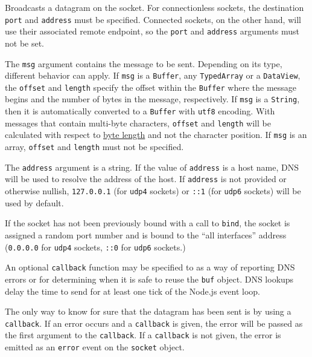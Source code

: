 Broadcasts a datagram on the socket. For connectionless sockets, the
destination \texttt{port} and \texttt{address} must be specified.
Connected sockets, on the other hand, will use their associated remote
endpoint, so the \texttt{port} and \texttt{address} arguments must not
be set.

The \texttt{msg} argument contains the message to be sent. Depending on
its type, different behavior can apply. If \texttt{msg} is a
\texttt{Buffer}, any \texttt{TypedArray} or a \texttt{DataView}, the
\texttt{offset} and \texttt{length} specify the offset within the
\texttt{Buffer} where the message begins and the number of bytes in the
message, respectively. If \texttt{msg} is a \texttt{String}, then it is
automatically converted to a \texttt{Buffer} with
\texttt{\textquotesingle{}utf8\textquotesingle{}} encoding. With
messages that contain multi-byte characters, \texttt{offset} and
\texttt{length} will be calculated with respect to
\href{buffer.md\#static-method-bufferbytelengthstring-encoding}{byte
length} and not the character position. If \texttt{msg} is an array,
\texttt{offset} and \texttt{length} must not be specified.

The \texttt{address} argument is a string. If the value of
\texttt{address} is a host name, DNS will be used to resolve the address
of the host. If \texttt{address} is not provided or otherwise nullish,
\texttt{\textquotesingle{}127.0.0.1\textquotesingle{}} (for
\texttt{udp4} sockets) or
\texttt{\textquotesingle{}::1\textquotesingle{}} (for \texttt{udp6}
sockets) will be used by default.

If the socket has not been previously bound with a call to
\texttt{bind}, the socket is assigned a random port number and is bound
to the ``all interfaces'' address
(\texttt{\textquotesingle{}0.0.0.0\textquotesingle{}} for \texttt{udp4}
sockets, \texttt{\textquotesingle{}::0\textquotesingle{}} for
\texttt{udp6} sockets.)

An optional \texttt{callback} function may be specified to as a way of
reporting DNS errors or for determining when it is safe to reuse the
\texttt{buf} object. DNS lookups delay the time to send for at least one
tick of the Node.js event loop.

The only way to know for sure that the datagram has been sent is by
using a \texttt{callback}. If an error occurs and a \texttt{callback} is
given, the error will be passed as the first argument to the
\texttt{callback}. If a \texttt{callback} is not given, the error is
emitted as an \texttt{\textquotesingle{}error\textquotesingle{}} event
on the \texttt{socket} object.

